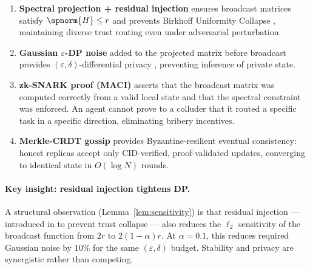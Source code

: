 \begin{enumerate}
  \item \textbf{Spectral projection + residual injection} ensures broadcast matrices
    satisfy $\spnorm{H} \leq r$ and prevents Birkhoff Uniformity Collapse
    \cite{mcfs_iclr2027}, maintaining diverse trust routing even under adversarial
    perturbation.

  \item \textbf{Gaussian $\varepsilon$-DP noise} added to the projected matrix before
    broadcast provides $({\varepsilon}, \delta)$-differential privacy
    \cite{dwork2014algorithmic}, preventing inference of private state.

  \item \textbf{zk-SNARK proof (MACI)} \cite{maci_spec} asserts that the broadcast matrix
    was computed correctly from a valid local state and that the spectral constraint was
    enforced.  An agent cannot prove to a colluder that it routed a specific task in a
    specific direction, eliminating bribery incentives.

  \item \textbf{Merkle-CRDT gossip} \cite{kleppmann2022crdt} provides Byzantine-resilient
    eventual consistency: honest replicas accept only CID-verified, proof-validated updates,
    converging to identical state in $O(\log N)$ rounds.
\end{enumerate}

\paragraph{Key insight: residual injection tightens DP.}
A structural observation (Lemma~\ref{lem:sensitivity}) is that residual injection —
introduced in \cite{mcfs_iclr2027} to prevent trust collapse — also reduces the
$\ell_2$ sensitivity of the broadcast function from $2r$ to $2(1-\alpha)r$.  At
$\alpha = 0.1$, this reduces required Gaussian noise by $10\%$ for the same
$(\varepsilon, \delta)$ budget.  Stability and privacy are synergistic rather than
competing.

